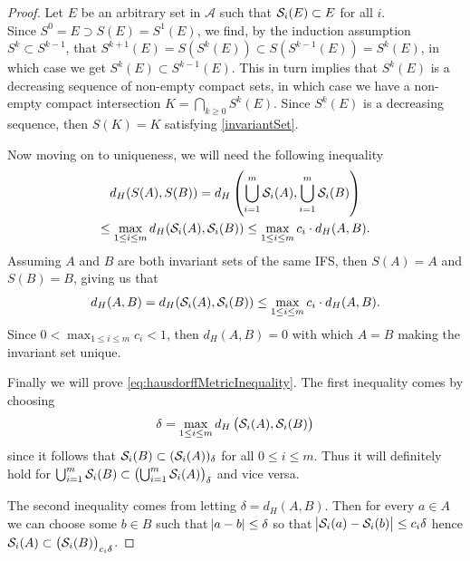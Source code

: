 \begin{proof}
	Let $E$ be an arbitrary set in $\mathcal{A}$ such that $\mathcal{S}_i(E) \subset E$ for all $i$. \\ Since $S^{0} = E \supset S(E) = S^{1}(E)$, we find, by the induction assumption $S^{k} \subset S^{k-1}$, that $S^{k+1}(E) = S(S^{k}(E)) \subset S(S^{k-1}(E)) = S^{k}(E)$, in which case we get $S^{k}(E) \subset S^{k-1}(E)$. This in turn implies that $S^{k}(E)$ is a decreasing sequence of non-empty compact sets, in which case we have a non-empty compact intersection $K = \bigcap_{k \geq 0} S^{k}(E)$. Since $S^{k}(E)$ is a decreasing sequence, then $S(K) = K$ satisfying \eqref{invariantSet}.
	
	Now moving on to uniqueness, we will need the following inequality
	\begin{multline}\label{eq:hausdorffMetricInequality}
		d_H(S(A), S(B)) = d_H \left(\bigcup_{i = 1}^{m} \mathcal{S}_i(A), \bigcup_{i = 1}^{m} \mathcal{S}_i(B)\right) \\
		\leq \max_{1 \leq i \leq m} d_H(\mathcal{S}_i(A), \mathcal{S}_i(B)) \leq \max_{1 \leq i \leq m} c_i \cdot d_H(A,B).
	\end{multline}
	Assuming $A$ and $B$ are both invariant sets of the same IFS, then $S(A) = A$ and $S(B) = B$, giving us that
	\begin{equation}
		d_H(A,B) = d_H(\mathcal{S}_i(A), \mathcal{S}_i(B)) \leq \max_{1 \leq i \leq m} c_i \cdot d_H(A,B).
	\end{equation}
	Since $0 < \max_{1 \leq i \leq m}  c_i < 1$, then $d_H(A,B) = 0$ with which  $A = B$ making the invariant set unique.
	
	Finally we will prove \eqref{eq:hausdorffMetricInequality}. The first inequality comes by choosing $$\delta = \max_{1 \leq i \leq m} d_H\left(\mathcal{S}_i(A), \mathcal{S}_i(B)\right)$$ 
	since it follows that $\mathcal{S}_i(B) \subset (\mathcal{S}_i(A))_{\delta}$ for all $0 \leq i \leq m$. Thus it will definitely hold for $\bigcup_{i = 1}^{m} \mathcal{S}_i(B) \subset \left(\bigcup_{i = 1}^{m} \mathcal{S}_i(A)\right) _{\delta}$ and vice versa. 
	
	The second inequality comes from letting $\delta = d_H(A,B)$. Then for every $a \in A$ we can choose some $b \in B$ such that $\abs{a-b} \leq \delta$ so that $\abs{\mathcal{S}_i(a) -\mathcal{S}_i(b)} \leq c_i \delta$ hence $\mathcal{S}_i(A) \subset \left(\mathcal{S}_i(B)\right)_{c_i \delta}$. 
\end{proof}

